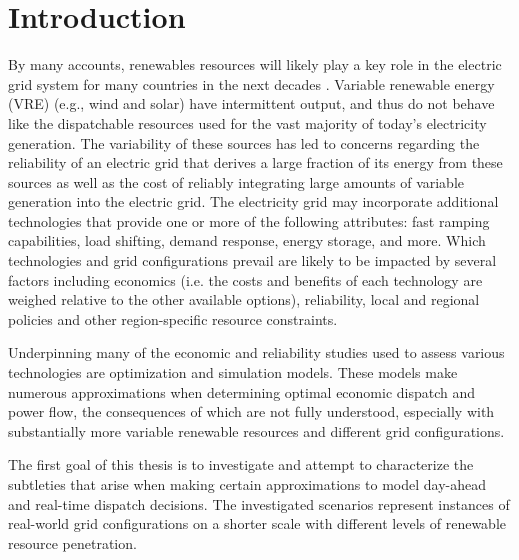 \documentclass[12pt,LUDisStyle,twosided]{book}
\begin{document}
\pagestyle{plain}
\dissertationtrue



\tableofcontents
\nopagebreak
\listoftables
\listoffigures
\newpage
\pagestyle{plain}

\pagestyle{plain}

\chapter{Introduction}

By many accounts, renewables resources will likely play a key role in the electric grid system for many countries in the next decades \cite{rahmangreen}.  Variable renewable energy (VRE) (e.g., wind and solar) have intermittent output, and thus do not behave like the dispatchable resources used for the vast majority of today’s electricity generation. The variability of these sources has led to concerns regarding the reliability of an electric grid that derives a large fraction of its energy from these sources as well as the cost of reliably integrating large amounts of variable generation into the electric grid. The electricity grid may incorporate additional technologies that provide one or more of the following attributes: fast ramping capabilities, load shifting, demand response, energy storage, and more.   Which technologies and grid configurations prevail are likely to be impacted by several factors including economics (i.e. the costs and benefits of each technology are weighed relative to the other available options), reliability, local and regional policies and other region-specific resource constraints.

Underpinning many of the economic and reliability studies used to assess various technologies are optimization and simulation models.  These models make numerous approximations when determining optimal economic dispatch and power flow, the consequences of which are not fully understood, especially with substantially more variable renewable resources and different grid configurations. 

The first goal of this thesis is to investigate and attempt to characterize the subtleties that arise when making certain approximations to model day-ahead and real-time dispatch decisions. The investigated scenarios represent instances of real-world grid configurations on a shorter scale with different levels of renewable resource penetration.
\end{document}

